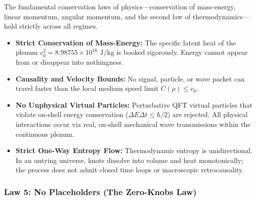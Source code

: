 \documentclass[11pt,a4paper]{article}
\begin{document}
The fundamental conservation laws of physics---conservation of mass-energy, linear momentum, angular momentum, and the second law of thermodynamics---hold strictly across all regimes.
\begin{itemize}
    \item \textbf{Strict Conservation of Mass-Energy:} The specific latent heat of the plenum $c_0^2 = 8.98755 \times 10^{16}\text{ J/kg}$ is booked rigorously. Energy cannot appear from or disappear into nothingness.
    \item \textbf{Causality and Velocity Bounds:} No signal, particle, or wave packet can travel faster than the local medium speed limit $C(\rho) \le c_0$.
    \item \textbf{No Unphysical Virtual Particles:} Perturbative QFT virtual particles that violate on-shell energy conservation ($\Delta E \Delta t \le \hbar/2$) are rejected. All physical interactions occur via real, on-shell mechanical wave transmissions within the continuous plenum.
    \item \textbf{Strict One-Way Entropy Flow:} Thermodynamic entropy is unidirectional. In an untying universe, knots dissolve into volume and heat monotonically; the process does not admit closed time loops or macroscopic retrocausality.
\end{itemize}

\subsubsection{Law 5: No Placeholders (The Zero-Knobs Law)}
\label{subsubsec:law_5_no_placeholders}
\end{document}
